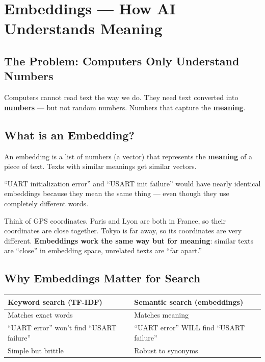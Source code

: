 \documentclass[11pt,a4paper]{report}
\begin{document}
\chapter{Embeddings --- How AI Understands Meaning}

\section{The Problem: Computers Only Understand Numbers}

Computers cannot read text the way we do. They need text converted into \textbf{numbers} --- but not random numbers. Numbers that capture the \textbf{meaning}.

\section{What is an Embedding?}

An embedding is a list of numbers (a vector) that represents the \textbf{meaning} of a piece of text. Texts with similar meanings get similar vectors.

``UART initialization error'' and ``USART init failure'' would have nearly identical embeddings because they mean the same thing --- even though they use completely different words.

\begin{analogybox}
Think of GPS coordinates. Paris and Lyon are both in France, so their coordinates are close together. Tokyo is far away, so its coordinates are very different. \textbf{Embeddings work the same way but for meaning}: similar texts are ``close'' in embedding space, unrelated texts are ``far apart.''
\end{analogybox}

\section{Why Embeddings Matter for Search}

\begin{table}[h]
\centering
\begin{tabularx}{\textwidth}{X X}
\toprule
\textbf{Keyword search (TF-IDF)} & \textbf{Semantic search (embeddings)} \\
\midrule
Matches exact words & Matches meaning \\
``UART error'' won't find ``USART failure'' & ``UART error'' WILL find ``USART failure'' \\
Simple but brittle & Robust to synonyms \\
\bottomrule
\end{tabularx}
\end{table}
\end{document}
